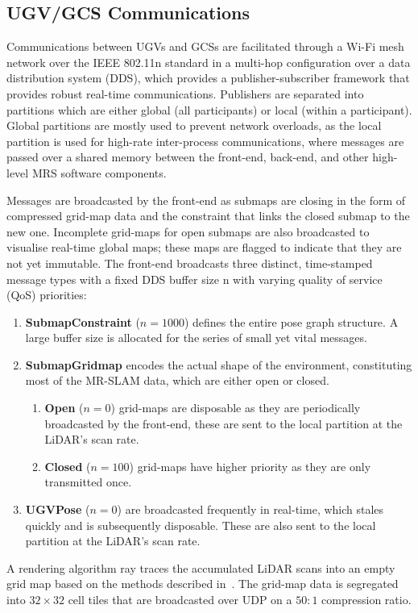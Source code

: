 

\subsection{UGV/GCS Communications}
Communications between UGVs and GCSs are facilitated through a Wi-Fi mesh network over the IEEE 802.11n standard in a multi-hop configuration over a data distribution system (DDS), which provides a publisher-subscriber framework that provides robust real-time communications. Publishers are separated into partitions which are either global (all participants) or local (within a participant). Global partitions are mostly used to prevent network overloads, as the local partition is used for high-rate inter-process communications, where messages are passed over a shared memory between the front-end, back-end, and other high-level MRS software components.

Messages are broadcasted by the front-end as submaps are closing in the form of compressed grid-map data and the constraint that links the closed submap to the new one. Incomplete grid-maps for open submaps are also broadcasted to visualise real-time global maps; these maps are flagged to indicate that they are not yet immutable. The front-end broadcasts three distinct, time-stamped message types with a fixed DDS buffer size n with varying quality of service (QoS) priorities:
\begin{enumerate}
	\item \textbf{SubmapConstraint} ($n = 1000$) defines the entire pose graph structure. A large buffer size is allocated for the series of small yet vital messages.
	\item \textbf{SubmapGridmap} encodes the actual shape of the environment, constituting most of the MR-SLAM data, which are either open or closed.
	\begin{enumerate}
		\item \textbf{Open} ($n = 0$) grid-maps are disposable as they are periodically broadcasted by the front-end, these are sent to the local partition at the LiDAR’s scan rate.
		\item \textbf{Closed} ($n = 100$) grid-maps have higher priority as they are only transmitted once.
	\end{enumerate}
	\item \textbf{UGVPose} ($n = 0$) are broadcasted frequently in real-time, which stales quickly and is subsequently disposable. These are also sent to the local partition at the LiDAR’s scan rate.
\end{enumerate}
A rendering algorithm ray traces the accumulated LiDAR scans into an empty grid map based on the methods described in~\cite{bresenham_algorithm_1965}. The grid-map data is segregated into $32\times32$ cell tiles that are broadcasted over UDP on a $50:1$ compression ratio.

